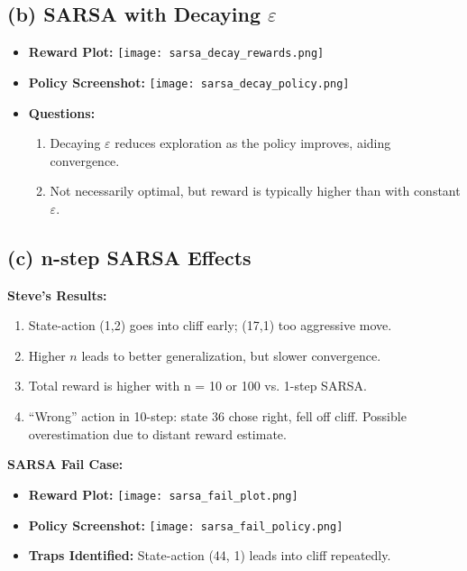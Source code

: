 \documentclass{article}
\begin{document}
\subsection*{(b) SARSA with Decaying $\varepsilon$}
\begin{itemize}
    \item \textbf{Reward Plot:} 
    \texttt{[image: sarsa\_decay\_rewards.png]}

    \item \textbf{Policy Screenshot:}
    \texttt{[image: sarsa\_decay\_policy.png]}

    \item \textbf{Questions:}
    \begin{enumerate}
        \item Decaying $\varepsilon$ reduces exploration as the policy improves, aiding convergence.
        \item Not necessarily optimal, but reward is typically higher than with constant $\varepsilon$.
    \end{enumerate}
\end{itemize}

\subsection*{(c) n-step SARSA Effects}

\textbf{Steve’s Results:}
\begin{enumerate}
    \item State-action (1,2) goes into cliff early; (17,1) too aggressive move.
    \item Higher $n$ leads to better generalization, but slower convergence.
    \item Total reward is higher with n = 10 or 100 vs. 1-step SARSA.
    \item “Wrong” action in 10-step: state 36 chose right, fell off cliff. Possible overestimation due to distant reward estimate.
\end{enumerate}

\textbf{SARSA Fail Case:}
\begin{itemize}
    \item \textbf{Reward Plot:}
    \texttt{[image: sarsa\_fail\_plot.png]}

    \item \textbf{Policy Screenshot:}
    \texttt{[image: sarsa\_fail\_policy.png]}

    \item \textbf{Traps Identified:} State-action (44, 1) leads into cliff repeatedly.
\end{itemize}
\end{document}
